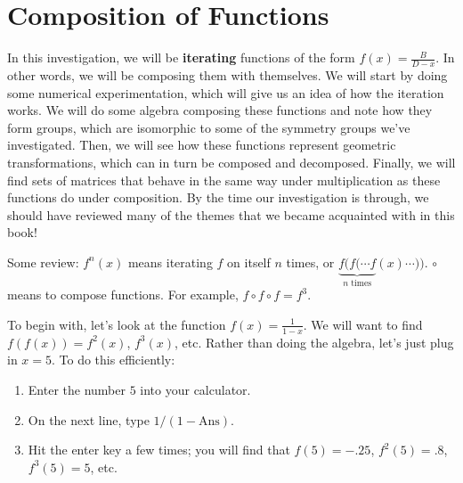 \documentclass[../gatm.tex]{subfiles}
\begin{document}
\section{Composition of Functions}
\setcounter{problem_i}{0}

In this investigation, we will be \textbf{iterating} functions of the form $f(x)=\frac{B}{D-x}$. In other words, we will be composing them with themselves. We will start by doing some numerical experimentation, which will give us an idea of how the iteration works. We will do some algebra composing these functions and note how they form groups, which are isomorphic to some of the symmetry groups we've investigated. Then, we will see how these functions represent geometric transformations, which can in turn be composed and decomposed. Finally, we will find sets of matrices that behave in the same way under multiplication as these functions do under composition. By the time our investigation is through, we should have reviewed many of the themes that we became acquainted with in this book!

Some review: $f^n(x)$ means iterating $f$ on itself $n$ times, or $\underbrace{f(f(\cdots f}_{n\text{ times}}(x)\cdots ))$. $\circ$ means to compose functions. For example, $f\circ f\circ f = f^3$.

To begin with, let's look at the function $f(x)=\frac{1}{1-x}$. We will want to find $f(f(x))=f^2(x)$, $f^3(x)$, etc. Rather than doing the algebra, let's just plug in $x=5$. To do this efficiently:

\begin{enumerate}
\item Enter the number $5$ into your calculator.
\item On the next line, type $1/(1-\text{Ans}).$
\item Hit the enter key a few times; you will find that $f(5)=-.25$, $f^2(5)=.8$, $f^3(5)=5$, etc.
\end{enumerate}
\end{document}

